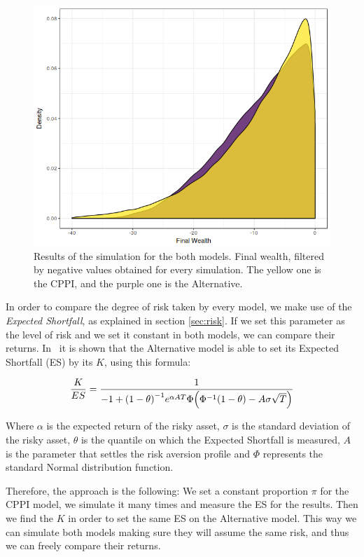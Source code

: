\begin{figure}[H]
    \centering
    \includegraphics[scale=0.5]{./images/loss_both.png}
    \caption{Results of the simulation for the both models. Final wealth, filtered by negative values obtained for every simulation. The yellow one is the CPPI, and the purple one is the Alternative.}
    \label{fig:loss_both}
\end{figure}

In order to compare the degree of risk taken by every model, we make use of the \textit{Expected Shortfall}, as explained in section \ref{sec:risk}. If we set this parameter as the level of risk and we set it constant in both models, we can compare their returns. In~\cite{a:guillen-optimisation} it is shown that the Alternative model is able to set its Expected Shortfall (ES) by its $K$, using this formula:

\begin{align}
	\frac{K}{ES} = \frac{1}{-1 + \qty(1 - \theta)^{-1} e^{\alpha A T}\Phi\qty(\Phi^{-1}\qty(1 - \theta) - A\sigma\sqrt{T})}
\end{align}

Where $\alpha$ is the expected return of the risky asset, $\sigma$ is the standard deviation of the risky asset, $\theta$ is the quantile on which the Expected Shortfall is measured, $A$ is the parameter that settles the risk aversion profile and $\Phi$ represents the standard Normal distribution function.

Therefore, the approach is the following: We set a constant proportion $\pi$ for the CPPI model, we simulate it many times and measure the ES for the results. Then we find the $K$ in order to set the same ES on the Alternative model. This way we can simulate both models making sure they will assume the same risk, and thus we can freely compare their returns.

